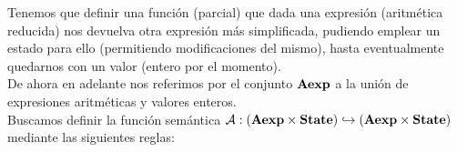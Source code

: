 Tenemos que definir una función (parcial) que dada una expresión (aritmética reducida) nos devuelva otra expresión más simplificada, pudiendo emplear un estado para ello (permitiendo modificaciones del mismo), hasta eventualmente quedarnos con un valor (entero por el momento).\\

De ahora en adelante nos referimos por el conjunto $\textbf{Aexp}$ a la unión de expresiones aritméticas y valores enteros.\\

Buscamos definir la función semántica $\mathcal{A}: (\textbf{Aexp} \times \textbf{State}) \hookrightarrow (\textbf{Aexp} \times \textbf{State})$ mediante las siguientes reglas:

\begin{prooftree*}
\end{prooftree*}

\begin{prooftree*}
\end{prooftree*}

\begin{prooftree*}
\end{prooftree*}

\begin{prooftree*}
\end{prooftree*}

\begin{prooftree*}
\end{prooftree*}

\begin{prooftree*}
\end{prooftree*}

